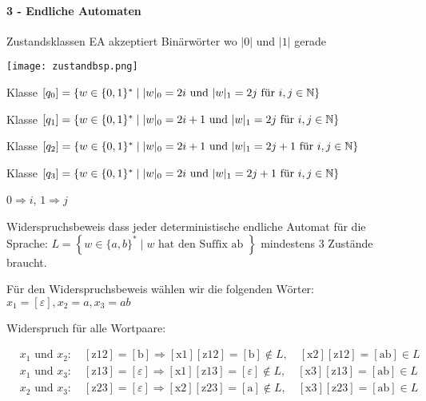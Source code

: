 \paragraph*{3 - Endliche Automaten}


\begin{example2}{Zustandsklassen} {\small EA akzeptiert Binärwörter wo $|0|$ und $|1|$ gerade}

    \begin{minipage}
        {0.3\linewidth}
        \texttt{[image: zustandbsp.png]}
    \end{minipage}
    \begin{minipage}{0.7\linewidth}
        
        Klasse $[q_0] = \{w \in \{0,1\}^* \mid |w|_0 = 2i \text{ und } |w|_1 = 2j \text{ für } i,j \in \mathbb{N}\}$

        Klasse $[q_1] = \{w \in \{0,1\}^* \mid |w|_0 = 2i+1 \text{ und } |w|_1 = 2j \text{ für } i,j \in \mathbb{N}\}$

        Klasse $[q_2] = \{w \in \{0,1\}^* \mid |w|_0 = 2i+1 \text{ und } |w|_1 = 2j+1 \text{ für } i,j \in \mathbb{N}\}$

        Klasse $[q_3] = \{w \in \{0,1\}^* \mid |w|_0 = 2i \text{ und } |w|_1 = 2j+1 \text{ für } i,j \in \mathbb{N}\}$
        
    \end{minipage}

    {\small $0 \Rightarrow i$, $1 \Rightarrow j$}
\end{example2}

\begin{example2}{Widerspruchsbeweis}
   dass jeder deterministische endliche Automat für die Sprache:
$
L=\left\{w \in\{a, b\}^* \mid w \text { hat den Suffix ab }\right\}
$
mindestens 3 Zustände braucht.

Für den Widerspruchsbeweis wählen wir die folgenden Wörter: $x_1=[\varepsilon], x_2=a, x_3=ab$

Widerspruch für alle Wortpaare:

$
\begin{aligned}
& x_1 \text { und } x_2: \quad[\mathrm{z} 12]=[\mathrm{b}] \Rightarrow[\mathrm{x} 1][\mathrm{z} 12]=[\mathrm{b}] \notin L, \quad[\mathrm{x} 2][\mathrm{z} 12]=[\mathrm{ab}] \in L \\
& x_1 \text { und } x_3: \quad[\mathrm{z} 13]=[\varepsilon] \Rightarrow[\mathrm{x} 1][\mathrm{z} 13]=[\varepsilon] \notin L, \quad[\mathrm{x} 3][\mathrm{z} 13]=[\mathrm{ab}] \in L \\
& x_2 \text { und } x_3: \quad[\mathrm{z} 23]=[\varepsilon] \Rightarrow[\mathrm{x} 2][\mathrm{z} 23]=[\mathrm{a}] \notin L, \quad[\mathrm{x} 3][\mathrm{z} 23]=[\mathrm{ab}] \in L \\
&
\end{aligned}
$
\end{example2}


